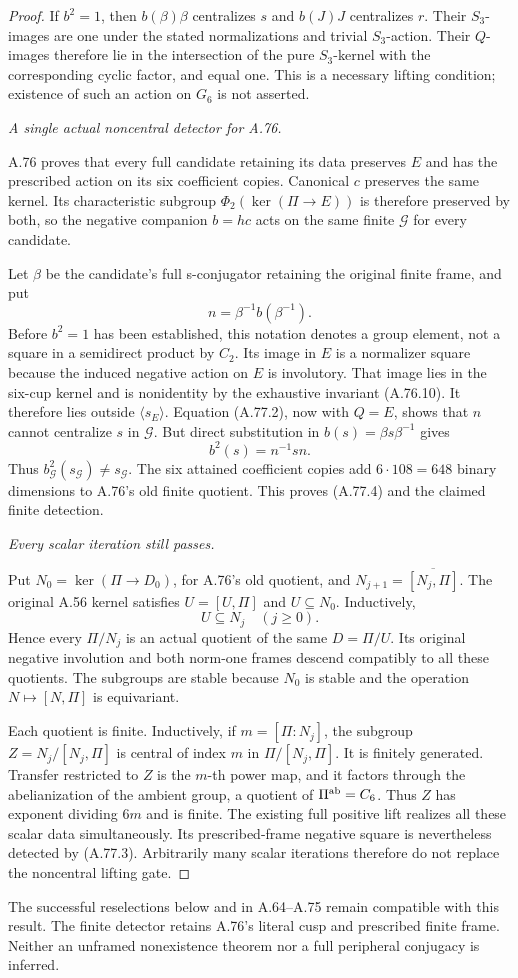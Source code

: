 \begin{proof}
If \(b^2=1\), then \(b(\beta)\beta\) centralizes \(s\) and
\(b(J)J\) centralizes \(r\). Their \(S_3\)-images are one under
the stated normalizations and trivial \(S_3\)-action. Their
\(Q\)-images therefore lie in the intersection of the pure
\(S_3\)-kernel with the corresponding cyclic factor, and equal
one. This is a necessary lifting condition; existence of such an
action on \(G_6\) is not asserted.

\emph{A single actual noncentral detector for A.76.}\par
A.76 proves that every full candidate retaining its data preserves
\(E\) and has the prescribed action on its six coefficient copies.
Canonical \(c\) preserves the same kernel. Its characteristic
subgroup \(\Phi_2(\ker(\Pi\to E))\) is therefore preserved by
both, so the negative companion \(b=hc\) acts on the same finite
\(\mathcal G\) for every candidate.

Let \(\beta\) be the candidate's full s-conjugator retaining the
original finite frame, and put
\[
                         n=\beta^{-1}b(\beta^{-1}).
 \tag{A.77.7}
\]
Before \(b^2=1\) has been established, this notation denotes a
group element, not a square in a semidirect product by \(C_2\).
Its image in \(E\) is a normalizer square because the induced
negative action on \(E\) is involutory. That image lies in the
six-cup kernel and is nonidentity by the exhaustive invariant
(A.76.10). It therefore lies outside \(\langle s_E\rangle\).
Equation (A.77.2), now with \(Q=E\), shows that \(n\) cannot
centralize \(s\) in \(\mathcal G\). But direct substitution in
\(b(s)=\beta s\beta^{-1}\) gives
\[
                           b^2(s)=n^{-1}sn.
 \tag{A.77.8}
\]
Thus \(b_{\mathcal G}^2(s_{\mathcal G})\ne s_{\mathcal G}\).
The six attained coefficient copies add \(6\cdot108=648\)
binary dimensions to A.76's old finite quotient. This proves
(A.77.4) and the claimed finite detection.

\emph{Every scalar iteration still passes.}\par
Put \(N_0=\ker(\Pi\to D_0)\), for A.76's old quotient, and
\(N_{j+1}=\overline{[N_j,\Pi]}\). The original A.56 kernel
satisfies \(U=[U,\Pi]\) and \(U\subseteq N_0\). Inductively,
\[
                            U\subseteq N_j\quad(j\ge0).
 \tag{A.77.9}
\]
Hence every \(\Pi/N_j\) is an actual quotient of the same
\(D=\Pi/U\). Its original negative involution and both
norm-one frames descend compatibly to all these quotients.
The subgroups are stable because \(N_0\) is stable and the
operation \(N\mapsto[N,\Pi]\) is equivariant.

Each quotient is finite. Inductively, if \(m=[\Pi:N_j]\), the
subgroup \(Z=N_j/[N_j,\Pi]\) is central of index \(m\) in
\(\Pi/[N_j,\Pi]\). It is finitely generated. Transfer restricted
to \(Z\) is the \(m\)-th power map, and it factors through the
abelianization of the ambient group, a quotient of
\(\Pi^{\rm ab}=C_6\). Thus \(Z\) has exponent dividing \(6m\)
and is finite. The existing full positive lift realizes all these
scalar data simultaneously. Its prescribed-frame negative square
is nevertheless detected by (A.77.3). Arbitrarily many scalar
iterations therefore do not replace the noncentral lifting gate.
\end{proof}

The successful reselections below and in A.64--A.75 remain
compatible with this result. The finite detector retains A.76's
literal cusp and prescribed finite frame. Neither an unframed
nonexistence theorem nor a full peripheral conjugacy is inferred.
